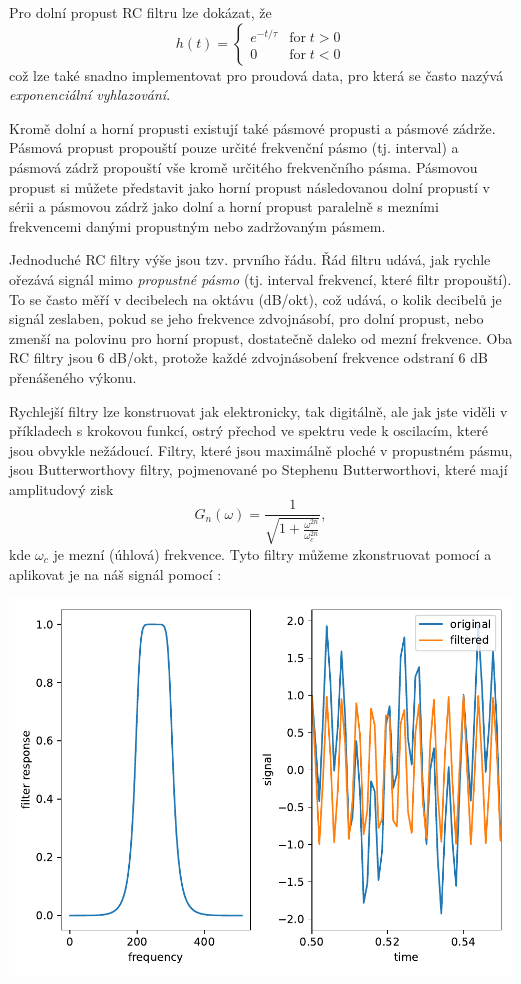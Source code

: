 Pro dolní propust RC filtru lze dokázat, že
\begin{equation}
    h(t) = \left\{\begin{matrix}
        e^{-t/\tau} & \mathrm{for}\; t > 0 \\
        0 & \mathrm{for}\; t < 0
    \end{matrix}\right.
\end{equation}
což lze také snadno implementovat pro proudová data, pro která se často nazývá \emph{exponenciální vyhlazování}.

Kromě dolní a horní propusti existují také pásmové propusti a pásmové zádrže. Pásmová propust propouští pouze určité frekvenční pásmo (tj. interval) a pásmová zádrž propouští vše kromě určitého frekvenčního pásma. Pásmovou propust si můžete představit jako horní propust následovanou dolní propustí v sérii a pásmovou zádrž jako dolní a horní propust paralelně s mezními frekvencemi danými propustným nebo zadržovaným pásmem.

Jednoduché RC filtry výše jsou tzv. prvního řádu. Řád filtru udává, jak rychle ořezává signál mimo \emph{propustné pásmo} (tj. interval frekvencí, které filtr propouští). To se často měří v decibelech na oktávu (dB/okt), což udává, o kolik decibelů je signál zeslaben, pokud se jeho frekvence zdvojnásobí, pro dolní propust, nebo zmenší na polovinu pro horní propust, dostatečně daleko od mezní frekvence. Oba RC filtry jsou 6 dB/okt, protože každé zdvojnásobení frekvence odstraní 6 dB přenášeného výkonu.

Rychlejší filtry lze konstruovat jak elektronicky, tak digitálně, ale jak jste viděli v příkladech s krokovou funkcí, ostrý přechod ve spektru vede k oscilacím, které jsou obvykle nežádoucí. Filtry, které jsou maximálně ploché v propustném pásmu, jsou Butterworthovy filtry, pojmenované po Stephenu Butterworthovi, které mají amplitudový zisk
\begin{equation*}
    G_n(\omega) = \frac{1}{\sqrt{1 + \frac{\omega^{2n}}{\omega_c^{2n}}}},
\end{equation*}
kde $\omega_c$ je mezní (úhlová) frekvence. Tyto filtry můžeme zkonstruovat pomocí  a aplikovat je na náš signál pomocí 
:
\begin{center}
    \includegraphics[width=0.5\linewidth]{butter.pdf}
\end{center}

